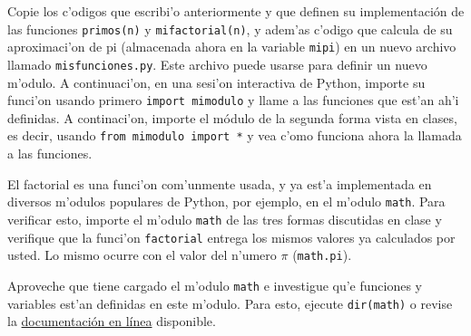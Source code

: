 \documentclass[11pt]{exam}
\begin{document}
\firstpageheadrule
\runningheadrule
{}
\cfoot{ }
\begin{flushleft}
\vspace{0.2in}

\vspace{0.25cm}
\end{flushleft}

\begin{questions}
\item Copie los c'odigos que escribi'o anteriormente y que definen su implementación de  las funciones \texttt{primos(n)} y \texttt{mifactorial(n)}, y adem'as c'odigo que calcula de su aproximaci'on de pi (almacenada ahora en la variable \texttt{mipi}) en un nuevo archivo llamado \texttt{misfunciones.py}. Este archivo puede usarse para definir un nuevo m'odulo. A continuaci'on, en una sesi'on interactiva de Python, importe su funci'on usando primero \texttt{import mimodulo} y llame a las funciones que est'an ah'i definidas. A continaci'on, importe el módulo de la segunda forma vista en clases, es decir, usando \texttt{from mimodulo import *} y vea c'omo funciona ahora la llamada a las funciones.

\item El factorial es una funci'on com'unmente usada, y ya est'a implementada en diversos m'odulos populares de Python, por ejemplo, en el m'odulo \texttt{math}. Para verificar esto, importe el m'odulo \texttt{math} de las tres formas discutidas en clase y verifique que la funci'on \texttt{factorial} entrega los mismos valores ya calculados por usted. Lo mismo ocurre con el valor del n'umero $\pi$ (\texttt{math.pi}). 

\item Aproveche que tiene cargado el m'odulo \texttt{math} e investigue qu'e funciones y variables est'an definidas en este m'odulo. Para esto, ejecute \texttt{dir(math)} o revise la \href{https://docs.python.org/2/library/math.html}{documentaci\'on en l\'inea} disponible.
\end{questions}
\end{document}
